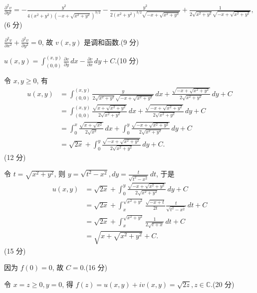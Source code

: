 \documentclass{homework}
\begin{document}
\(\frac{\partial^2 v}{\partial y^2}=-\frac{y^2}{4 \left(x^2+y^2\right) \left(-x+\sqrt{x^2+y^2}\right)^{3/2}}-\frac{y^2}{2 \left(x^2+y^2\right)^{3/2} \sqrt{-x+\sqrt{x^2+y^2}}}+\frac{1}{2 \sqrt{x^2+y^2} \sqrt{-x+\sqrt{x^2+y^2}}},\)\hfill (6 分)

\(\frac{\partial^2 v}{\partial x^2}+\frac{\partial^2 v}{\partial y^2}=0\), 故 \(v(x, y)\) 是调和函数.\hfill (9 分)

\(u(x,y)=\int_{(0,0)}^{(x,y)}\frac{\partial v}{\partial y}\,dx-\frac{\partial v}{\partial x}\,dy+C\).\hfill (10 分)

令 \(x, y\geq0\), 有
\begin{align*}
  u(x,y)&=\int_{(0,0)}^{(x,y)}\frac{y}{2 \sqrt{x^2+y^2} \sqrt{-x+\sqrt{x^2+y^2}}}\,dx+\frac{\sqrt{-x+\sqrt{x^2+y^2}}}{2 \sqrt{x^2+y^2}}\,dy+C\\
  &=\int_{(0,0)}^{(x,y)}\frac{\sqrt{x+\sqrt{x^2+y^2}}}{2 \sqrt{x^2+y^2}}\,dx+\frac{\sqrt{-x+\sqrt{x^2+y^2}}}{2 \sqrt{x^2+y^2}}\,dy+C\\
  &=\int_{0}^{x}\frac{\sqrt{x+\sqrt{x^2}}}{2 \sqrt{x^2}}\,dx+\int_{0}^{y}\frac{\sqrt{-x+\sqrt{x^2+y^2}}}{2 \sqrt{x^2+y^2}}\,dy+C\\
  &=\sqrt{2x}+\int_{0}^{y}\frac{\sqrt{-x+\sqrt{x^2+y^2}}}{2 \sqrt{x^2+y^2}}\,dy+C.
\end{align*}\hfill (12 分)

令 \(t=\sqrt{x^2+y^2}\), 则 \(y=\sqrt{t^2-x^2}, dy=\frac{t}{\sqrt{t^2-x^2}}\,dt\), 于是
\begin{align*}
  u(x,y)&=\sqrt{2x}+\int_{0}^{y}\frac{\sqrt{-x+\sqrt{x^2+y^2}}}{2 \sqrt{x^2+y^2}}\,dy+C\\
  &=\sqrt{2x}+\int_{x}^{\sqrt{x^2+y^2}}\frac{\sqrt{-x+t}}{2t}\frac{t}{\sqrt{t^2-x^2}}\,dt+C\\
  &=\sqrt{2x}+\int_{x}^{\sqrt{x^2+y^2}}\frac{1}{2\sqrt{t+x}}\,dt+C\\
  &=\sqrt{x+\sqrt{x^2+y^2}}+C.
\end{align*}\hfill (15 分)

因为 \(f(0)=0\), 故 \(C=0\).\hfill (16 分)

令 \(x=z\geq0, y=0\), 得 \(f(z)=u(x,y)+iv(x,y)=\sqrt{2z}, z\in\mathbb{C}\).\hfill (20 分)
\end{document}
